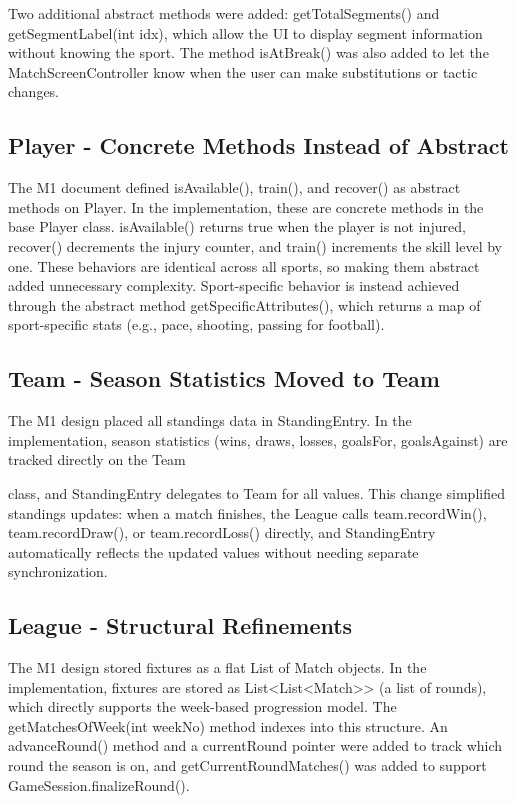 \documentclass[11pt,a4paper]{article}
\begin{document}
Two additional abstract methods were added: getTotalSegments() and getSegmentLabel(int idx), which allow the UI to display segment information without knowing the sport. The method isAtBreak() was also added to let the MatchScreenController know when the user can make substitutions or tactic changes.

\subsection{Player - Concrete Methods Instead of Abstract}

The M1 document defined isAvailable(), train(), and recover() as abstract methods on Player. In the implementation, these are concrete methods in the base Player class. isAvailable() returns true when the player is not injured, recover() decrements the injury counter, and train() increments the skill level by one. These behaviors are identical across all sports, so making them abstract added unnecessary complexity. Sport-specific behavior is instead achieved through the abstract method getSpecificAttributes(), which returns a map of sport-specific stats (e.g., pace, shooting, passing for football).

\subsection{Team - Season Statistics Moved to Team}

The M1 design placed all standings data in StandingEntry. In the implementation, season statistics (wins, draws, losses, goalsFor, goalsAgainst) are tracked directly on the Team

class, and StandingEntry delegates to Team for all values. This change simplified standings updates: when a match finishes, the League calls team.recordWin(), team.recordDraw(), or team.recordLoss() directly, and StandingEntry automatically reflects the updated values without needing separate synchronization.

\subsection{League - Structural Refinements}

The M1 design stored fixtures as a flat List of Match objects. In the implementation, fixtures are stored as List\textless List\textless Match\textgreater\textgreater{} (a list of rounds), which directly supports the week-based progression model. The getMatchesOfWeek(int weekNo) method indexes into this structure. An advanceRound() method and a currentRound pointer were added to track which round the season is on, and getCurrentRoundMatches() was added to support GameSession.finalizeRound().
\end{document}
